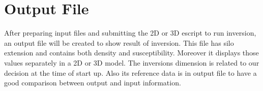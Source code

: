 \section{Output File}

After preparing input files and submitting the 2D or 3D escript to run inversion, an output file will be created to show result of inversion. This file has silo extension and contains both density and susceptibility. Moreover it displays those values separately in a 2D or 3D model. The inversions dimension is related to our decision at the time of start up. Also its reference data is in output file to have a good comparison between output and input information.

% 
%  
% 
% 
% 
% 
% 
% 
% 
% 
